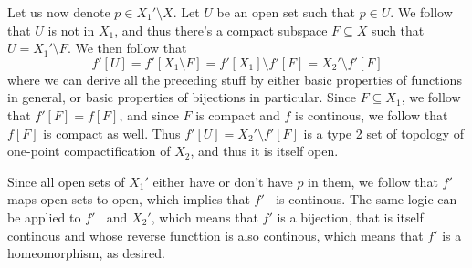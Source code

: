 \documentclass[11pt,oneside,titlepage]{book}
\DeclareMathOperator \inv {^{-1}}
\begin{document}
Let us now denote $p \in X_1' \setminus X$. Let $U$ be an open set such that $p \in U$.
We follow that $U$ is not in $X_1$, and thus there's a compact subspace $F \subseteq X$ such
that $U = X_1' \setminus F$. We then follow that
$$f'[U] = f'[X_1 \setminus F] = f'[X_1] \setminus f'[F] = X_2' \setminus f'[F]$$
where we can derive all the preceding stuff by either basic properties of functions in general,
or basic properties of bijections in particular. 
Since $F \subseteq X_1$, we follow that $f'[F] = f[F]$, and since $F$ is compact and $f$
is continous, we follow that $f[F]$ is compact as well. Thus $f'[U] = X_2' \setminus f'[F]$
is a type 2 set of topology of one-point compactification of $X_2$, and thus it is itself open.

Since all open sets of $X_1'$ either have or don't have $p$ in them, we follow that $f'$
maps open sets to open, which implies that $f'\inv$ is continous. The same logic
can be applied to $f'\inv$ and $X_2'$, which means that $f'$ is a bijection, that is itself
continous and whose reverse functtion is also continous, which means that $f'$ is a homeomorphism,
as desired.
\end{document}
